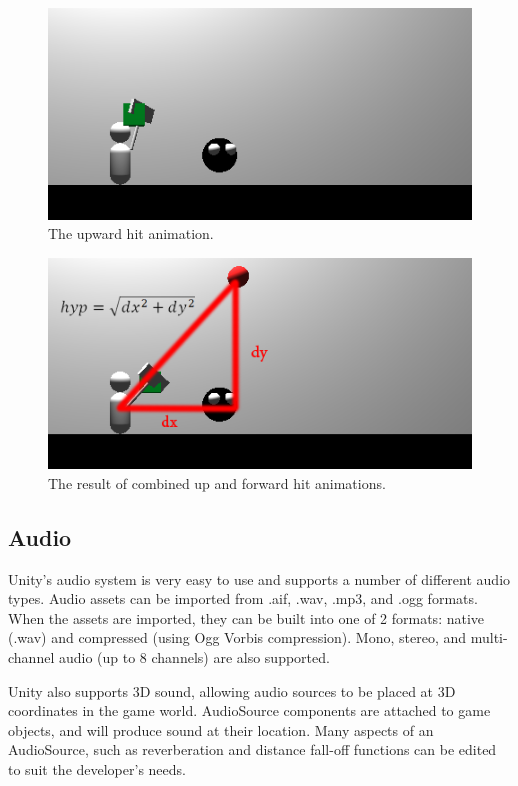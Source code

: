 \documentclass{article}
\begin{document}
\begin{figure}[h!]

\includegraphics[width=5in]{Graphics/upHit.png}
\caption{The upward hit animation.}
\label{UpHit}

\end{figure}

\begin{figure}[h!]

\includegraphics[width=5in]{Graphics/hitDiag.png}
\caption{The result of combined up and forward hit animations.}
\label{DiagHit}

\end{figure}

\subsection{Audio}

Unity's audio system is very easy to use and supports a number of different audio types.  Audio assets can be imported from .aif, .wav, .mp3, and .ogg formats.  When the assets are imported, they can be built into one of 2 formats: native (.wav) and compressed (using Ogg Vorbis compression).  Mono, stereo, and multi-channel audio (up to 8 channels) are also supported.

Unity also supports 3D sound, allowing audio sources to be placed at 3D coordinates in the game world.  AudioSource components are attached to game objects, and will produce sound at their location.  Many aspects of an AudioSource, such as reverberation and distance fall-off functions can be edited to suit the developer's needs.
\end{document}
